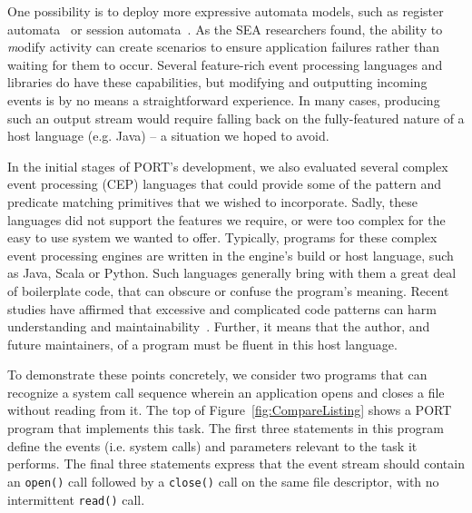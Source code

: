 One possibility is to deploy more expressive automata models, such as register automata~\cite{DBLP:journals/tcs/KaminskiF94} or session automata~\cite{DBLP:journals/corr/BolligHLM14}.  As the
SEA researchers found,  the ability to
{\textit modify} activity can create scenarios to ensure
application failures rather than  waiting for them to occur.
Several feature-rich event processing
languages and libraries do have these capabilities, but
modifying and outputting
incoming events
is by no means a straightforward experience.
In many cases, producing such an output stream  would require
falling back on the fully-featured nature of a host language (e.g. Java) -- a situation
we hoped to avoid.

In the initial stages of PORT's development, we also
evaluated several
complex event processing (CEP) languages that
could
provide some of the pattern and predicate matching primitives
that we wished to
incorporate.
Sadly,
these languages did not
support  the features
we require,
or were too complex
for the easy to use  system we wanted to offer.
Typically,
programs for these complex event processing engines are
written in the engine's build or host language,
such as Java,
Scala or
Python.
Such languages generally bring with them a great deal of boilerplate code,
that can obscure or confuse
the program's meaning.
Recent studies
have affirmed that excessive and complicated code
patterns can harm
understanding and
maintainability~\cite{misunderstandings}.
Further,
it means that the author,
and future maintainers,
of a
program must be fluent in this host language.


To demonstrate these points concretely,
we consider two programs that can recognize a system call sequence wherein an
application opens and closes a file
without reading from it.
The top of Figure~\ref{fig:CompareListing} shows a PORT program that implements this
task.  The first three statements in this program define the events (i.e.
system calls) and parameters relevant to the task it performs.  The final three statements express that the event stream
should contain an \texttt{open()} call followed by a \texttt{close()} call on the same file descriptor, with no intermittent \texttt{read()} call.

